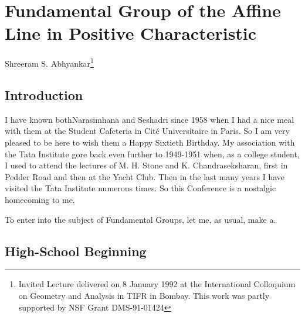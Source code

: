 \chapter{Fundamental Group of the Affine Line in Positive Characteristic}\label{chap1}


\begin{center}
{\large Shreeram S. Abhyankar}\footnote{Invited Lecture delivered on 8 January 1992 at the International Colloquium on Geometry and Analysis in TIFR in Bombay. This work was partly supported by NSF Grant DMS-91-01424}
\end{center}

\section{Introduction}\label{chap1-sec1}

I have known both\pageoriginale Narasimhana and Seshadri since 1958 when I had a nice meal with them at the Student Cafeteria in Cit\'e Universitaire in Paris. So I am very pleased to be here to wish them a Happy Sixtieth Birthday. My association with the Tata Institute gore back even further to 1949-1951 when, as a college student, I used to attend the lectures of M. H. Stone and K. Chandraseksharan, first in Pedder Road and then at the Yacht Club. Then in the last many years I have visited the Tata Institute numerous times. So this Conference is a nostalgic homecoming to me.     

To enter into the subject of Fundamental Groups, let me, as usual, make a.

\section{High-School Beginning}\label{chap1-sec2}

